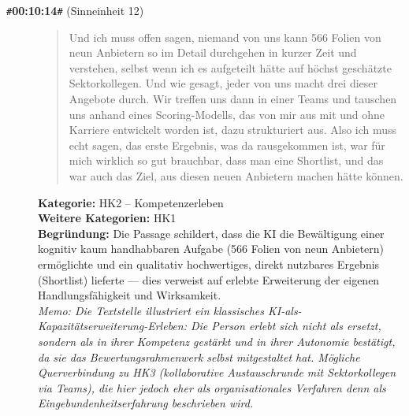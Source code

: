 \begin{description}
  \item[\texttt{\#}\textbf{00:10:14}\texttt{\#} (Sinneinheit 12)]
  \begin{quote}
  Und ich muss offen sagen, niemand von uns kann 566 Folien von neun Anbietern so im Detail durchgehen in kurzer Zeit und verstehen, selbst wenn ich es aufgeteilt hätte auf höchst geschätzte Sektorkollegen. Und wie gesagt, jeder von uns macht drei dieser Angebote durch. Wir treffen uns dann in einer Teams und tauschen uns anhand eines Scoring-Modells, das von mir aus mit und ohne Karriere entwickelt worden ist, dazu strukturiert aus. Also ich muss echt sagen, das erste Ergebnis, was da rausgekommen ist, war für mich wirklich so gut brauchbar, dass man eine Shortlist, und das war auch das Ziel, aus diesen neuen Anbietern machen hätte können.
  \end{quote}
  \textbf{Kategorie:} HK2 -- Kompetenzerleben\\
  \textbf{Weitere Kategorien:} HK1\\
  \textbf{Begr\"undung:} Die Passage schildert, dass die KI die Bewältigung einer kognitiv kaum handhabbaren Aufgabe (566 Folien von neun Anbietern) ermöglichte und ein qualitativ hochwertiges, direkt nutzbares Ergebnis (Shortlist) lieferte — dies verweist auf erlebte Erweiterung der eigenen Handlungsfähigkeit und Wirksamkeit.
  \\\textit{Memo: Die Textstelle illustriert ein klassisches KI-als-Kapazitätserweiterung-Erleben: Die Person erlebt sich nicht als ersetzt, sondern als in ihrer Kompetenz gestärkt und in ihrer Autonomie bestätigt, da sie das Bewertungsrahmenwerk selbst mitgestaltet hat. Mögliche Querverbindung zu HK3 (kollaborative Austauschrunde mit Sektorkollegen via Teams), die hier jedoch eher als organisationales Verfahren denn als Eingebundenheitserfahrung beschrieben wird.}
\end{description}
\medskip

